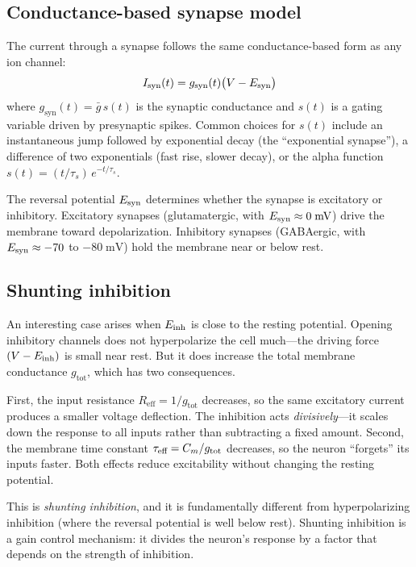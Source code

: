 \subsection{Conductance-based synapse model}

The current through a synapse follows the same conductance-based form as any ion channel:
%
\begin{equation}
  I_{\text{syn}}(t) = g_{\text{syn}}(t)\bigl(V - E_{\mathrm{\text{syn}}}\bigr)
  \label{eq:synapse-current}
\end{equation}
%
where $g_{\text{syn}}(t) = \bar{g}\,s(t)$ is the synaptic conductance and $s(t)$ is a gating variable driven by presynaptic spikes. Common choices for $s(t)$ include an instantaneous jump followed by exponential decay (the ``exponential synapse''), a difference of two exponentials (fast rise, slower decay), or the alpha function $s(t) = (t/\tau_s)\,e^{-t/\tau_s}$.

The reversal potential $E_{\mathrm{\text{syn}}}$ determines whether the synapse is excitatory or inhibitory. Excitatory synapses (glutamatergic, with $E_{\mathrm{\text{syn}}} \approx 0\;\text{mV}$) drive the membrane toward depolarization. Inhibitory synapses (GABAergic, with $E_{\mathrm{\text{syn}}} \approx -70$ to $-80\;\text{mV}$) hold the membrane near or below rest.

\subsection{Shunting inhibition}
\label{sec:shunting}

An interesting case arises when $E_{\mathrm{\text{inh}}}$ is close to the resting potential. Opening inhibitory channels does not hyperpolarize the cell much---the driving force $(V - E_{\mathrm{\text{inh}}})$ is small near rest. But it does increase the total membrane conductance $g_{\text{tot}}$, which has two consequences.

First, the input resistance $R_{\text{eff}} = 1/g_{\text{tot}}$ decreases, so the same excitatory current produces a smaller voltage deflection. The inhibition acts \emph{divisively}---it scales down the response to all inputs rather than subtracting a fixed amount. Second, the membrane time constant $\tau_{\text{eff}} = C_m/g_{\text{tot}}$ decreases, so the neuron ``forgets'' its inputs faster. Both effects reduce excitability without changing the resting potential.

This is \emph{shunting inhibition}, and it is fundamentally different from hyperpolarizing inhibition (where the reversal potential is well below rest). Shunting inhibition is a gain control mechanism: it divides the neuron's response by a factor that depends on the strength of inhibition.

